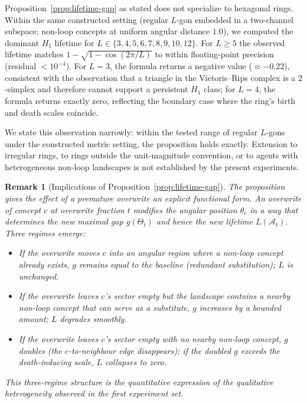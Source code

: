 \documentclass[12pt]{article}
\newtheorem{remark}{Remark}
\begin{document}
Proposition~\ref{prop:lifetime-gap} as stated does not specialize to
hexagonal rings. Within the same constructed setting (regular
$L$-gon embedded in a two-channel subspace; non-loop concepts at
uniform angular distance $1.0$), we computed the dominant $H_1$
lifetime for $L \in \{3, 4, 5, 6, 7, 8, 9, 10, 12\}$. For
$L \geq 5$ the observed lifetime matches
$1 - \sqrt{1 - \cos(2\pi / L)}$ to within floating-point precision
(residual $< 10^{-4}$). For $L = 3$, the formula returns a
negative value ($\approx -0.22$), consistent with the observation
that a triangle in the Vietoris--Rips complex is a $2$-simplex and
therefore cannot support a persistent $H_1$ class; for $L = 4$,
the formula returns exactly zero, reflecting the boundary case
where the ring's birth and death scales coincide.

We state this observation narrowly: within the tested range of
regular $L$-gons under the constructed metric setting, the
proposition holds exactly. Extension to irregular rings, to rings
outside the unit-magnitude convention, or to agents with
heterogeneous non-loop landscapes is not established by the
present experiments.

\begin{remark}[Implications of Proposition~\ref{prop:lifetime-gap}]
The proposition gives the effect of a premature overwrite an
explicit functional form. An overwrite of concept $c$ at overwrite
fraction $t$ modifies the angular position $\theta_c$ in a way
that determines the new maximal gap $g(\Theta_t)$ and hence the
new lifetime $L(\mathcal{A}_t)$. Three regimes emerge:
\begin{itemize}[noitemsep]
\item If the overwrite moves $c$ into an angular region where a
  non-loop concept already exists, $g$ remains equal to the
  baseline (redundant substitution); $L$ is unchanged.
\item If the overwrite leaves $c$'s sector empty but the landscape
  contains a nearby non-loop concept that can serve as a substitute,
  $g$ increases by a bounded amount; $L$ degrades smoothly.
\item If the overwrite leaves $c$'s sector empty with no nearby
  non-loop concept, $g$ doubles (the $c$-to-neighbour edge
  disappears); if the doubled $g$ exceeds the death-inducing scale,
  $L$ collapses to zero.
\end{itemize}
This three-regime structure is the quantitative expression of the
qualitative heterogeneity observed in the first experiment set.
\end{remark}
\end{document}
